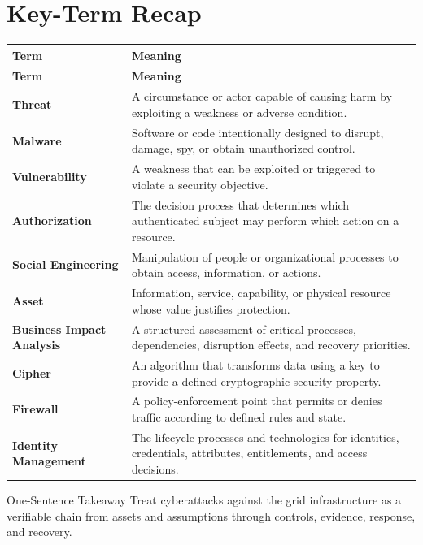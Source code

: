 \documentclass[11pt,letterpaper]{article}
\begin{document}
\section*{Key-Term Recap}
\begin{longtable}{>{\raggedright\arraybackslash}p{}>{\raggedright\arraybackslash}p{}}
\toprule\rowcolor{Navy}\color{white}\textbf{Term} & \color{white}\textbf{Meaning}\\\midrule
\endfirsthead
\toprule\rowcolor{Navy}\color{white}\textbf{Term} & \color{white}\textbf{Meaning}\\\midrule
\endhead
\textbf{Threat} & A circumstance or actor capable of causing harm by exploiting a weakness or adverse condition. \\\midrule
\textbf{Malware} & Software or code intentionally designed to disrupt, damage, spy, or obtain unauthorized control. \\\midrule
\textbf{Vulnerability} & A weakness that can be exploited or triggered to violate a security objective. \\\midrule
\textbf{Authorization} & The decision process that determines which authenticated subject may perform which action on a resource. \\\midrule
\textbf{Social Engineering} & Manipulation of people or organizational processes to obtain access, information, or actions. \\\midrule
\textbf{Asset} & Information, service, capability, or physical resource whose value justifies protection. \\\midrule
\textbf{Business Impact Analysis} & A structured assessment of critical processes, dependencies, disruption effects, and recovery priorities. \\\midrule
\textbf{Cipher} & An algorithm that transforms data using a key to provide a defined cryptographic security property. \\\midrule
\textbf{Firewall} & A policy-enforcement point that permits or denies traffic according to defined rules and state. \\\midrule
\textbf{Identity Management} & The lifecycle processes and technologies for identities, credentials, attributes, entitlements, and access decisions. \\\midrule
\bottomrule
\end{longtable}
\begin{CornellExamBox}{One-Sentence Takeaway}
Treat cyberattacks against the grid infrastructure as a verifiable chain from assets and assumptions through controls, evidence, response, and recovery.
\end{CornellExamBox}
\end{document}
